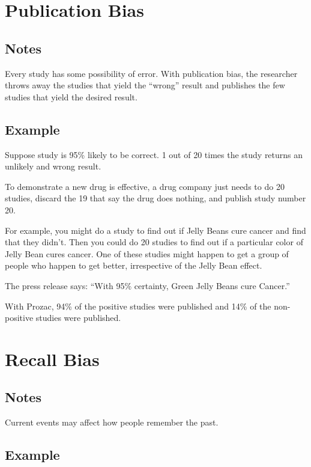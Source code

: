 \documentclass[landscape]{exam}
\begin{document}
  \section{Publication Bias}

  \subsection{Notes}
  Every study has some possibility of error.  With publication bias, the
  researcher throws away the studies that yield the ``wrong'' result and
  publishes the few studies that yield the desired result. 

  \subsection{Example}

  Suppose study is 95\% likely to be correct.  1 out of 20 times the study
  returns an unlikely and wrong result. 
  
  To demonstrate a new drug is effective, a drug
  company just needs to do 20 studies, discard the 19 that say the drug does
  nothing, and publish study number 20.

  For example, you might do a study to find out if Jelly Beans cure cancer and
  find that they didn't. Then you could do 20 studies to find out if a
  particular color of Jelly Bean cures cancer. One of these studies might happen
  to get a group of people who happen to get better, irrespective of the Jelly
  Bean effect.

  The press release says: ``With 95\% certainty, Green Jelly Beans cure Cancer.''

  With Prozac, 94\% of the positive studies were published and 14\% of the
  non-positive studies were published.

  \section{Recall Bias}

  \subsection{Notes}

  Current events may affect how people remember the past.  

  \subsection{Example}
\end{document}
